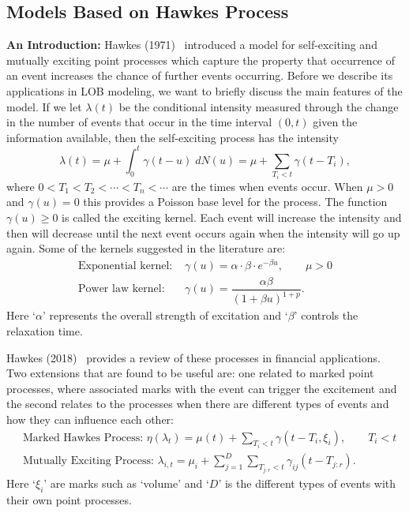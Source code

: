 \subsection{Models Based on Hawkes Process\label{sec:model_hawk_process}}\label{in:hawk1}

\noindent\textbf{An Introduction:} Hawkes (1971)~\cite{hawkes71} introduced a model for self-exciting and mutually exciting point processes which capture the property that occurrence of an event increases the chance of further events occurring. Before we describe its applications in LOB modeling, we want to briefly discuss the main features of the model. If we let $\lambda(t)$ be the conditional intensity measured through the change in the number of events that occur in the time interval $(0,t)$ given the information available, then the self-exciting process has the intensity
	\begin{equation} \label{eq:seintensity}
	\lambda(t)= \mu + \int_0^t \gamma(t-u) \;dN(u)= \mu + \sum_{T_i<t} \gamma(t-T_i),
	\end{equation}
where $0 < T_1 < T_2 < \cdots < T_n < \cdots$ are the times when events occur. When $\mu > 0$ and $\gamma(u)= 0$ this provides a Poisson base level for the process. The function $\gamma(u) \geq 0$ is called the exciting kernel. Each event will increase the intensity and then will decrease until the next event occurs again when the intensity will go up again. Some of the kernels suggested in the literature are:
	\begin{equation} \label{eq:suggex}
	\begin{aligned}
	\text{Exponential kernel: }& \gamma(u)= \alpha \cdot \beta \cdot e^{-\beta u}, \quad\quad \mu>0 \\
	\text{Power law kernel: }& \gamma(u)= \dfrac{\alpha \beta}{(1+\beta u)^{1+p}}.
	\end{aligned}
	\end{equation}
Here `$\alpha$' represents the overall strength of excitation and `$\beta$' controls the relaxation time. 


Hawkes (2018)~\cite{hawkes18} provides a review of these processes in financial applications. Two extensions that are found to be useful are: one related to marked point processes, where associated marks with the event can trigger the excitement and the second relates to the processes when there are different types of events and how they can influence each other:
	\begin{equation} \label{eq:markedhawk}
	\begin{aligned}
	&\text{Marked Hawkes Process:   } \eta(\lambda_t)= \mu(t) + \sum_{T_i < t} \gamma(t - T_i, \xi_i), \quad \quad T_i < t \\
	&\text{Mutually Exciting Process: } \lambda_{i,t}= \mu_i + \sum_{j=1}^D \sum_{T_{j:r} < t} \gamma_{ij} (t - T_{j:r}).
	\end{aligned}
	\end{equation}
Here `$\xi_i$' are marks such as `volume' and `$D$' is the different types of events with their own point processes. \twomedskip


